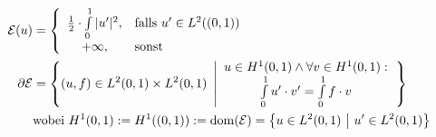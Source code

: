 \begin{beispiel}
	\begin{align*}
		\mathcal{E}(u)&=\left\lbrace\begin{array}{cl}
			\frac{1}{2}\cdot\int\limits_0^1|u'|^2,&\text{falls } u'\in L^2((0,1))\\
			+\infty, &\text{sonst }
		\end{array}\right.\\
		\partial\mathcal{E}&=\left\lbrace(u,f)\in L^2(0,1)\times L^2(0,1)~\left|
		\begin{array}{c}
			u\in H^1(0,1)\wedge\forall v\in H^1(0,1):\\
			\int\limits_0^1 u'\cdot v'=\int\limits_0^1 f\cdot v
		\end{array}
		\right.\right\rbrace\\
		&\text{wobei } H^1(0,1):=H^1((0,1)):=\operatorname{dom}(\mathcal{E})=\big\lbrace u\in L^2(0,1)~\big|~u'\in L^2(0,1)\big\rbrace
	\end{align*}


\end{beispiel}
